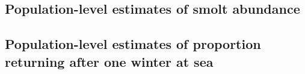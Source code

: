 \documentclass[12pt]{article}
\newcommand{\So}{$S_{1}$\xspace}
\newcommand{\St}{$S_{2}$\xspace}
\newcommand{\Pg}{$P_r$\xspace}
\begin{document}

\clearpage

\subsection*{Population-level estimates of smolt abundance}




\clearpage





\clearpage

\subsection*{Population-level estimates of proportion returning after one winter at sea}



\hspace{8em}




\end{document}
